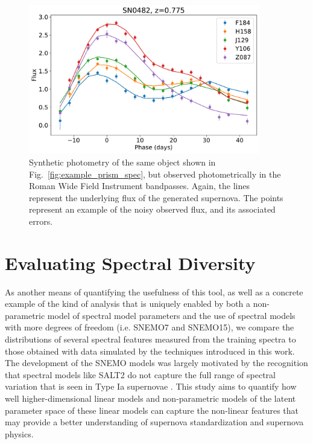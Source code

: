 \begin{figure}
    \centering
    \includegraphics[width=0.9\textwidth]{figures/snemo_kde/example_roman_lc.pdf}
    \caption{Synthetic photometry of the same object shown in Fig.~\ref{fig:example_prism_spec}, but observed photometrically in the Roman Wide Field Instrument bandpasses. Again, the lines represent the underlying flux of the generated supernova. The points represent an example of the noisy observed flux, and its associated errors.}
    \label{fig:example_roman_lc}
\end{figure}

\section{Evaluating Spectral Diversity}
\label{sec:spec_diversity}
As another means of quantifying the usefulness of this tool, as well as a concrete example of the kind of analysis that is uniquely enabled by both a non-parametric model of spectral model parameters and the use of spectral models with more degrees of freedom (i.e. SNEMO7 and SNEMO15), we compare the distributions of several spectral features measured from the training spectra to those obtained with data simulated by the techniques introduced in this work. The development of the SNEMO models was largely motivated by the recognition that spectral models like SALT2 do not capture the full range of spectral variation that is seen in Type Ia supernovae \citep{saunders_snemo_2018}. This study aims to quantify how well higher-dimensional linear models and non-parametric models of the latent parameter space of these linear models can capture the non-linear features that may provide a better understanding of supernova standardization and supernova physics.

